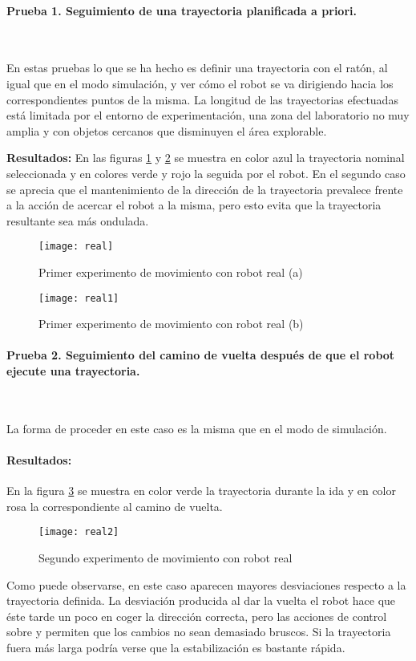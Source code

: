 \paragraph{Prueba 1. Seguimiento de una trayectoria planificada a priori.}\ %

\noindent
En estas pruebas lo que se ha hecho es definir una trayectoria con el ratón, al igual que en el modo simulación, y ver cómo el robot se va dirigiendo hacia los correspondientes puntos de la misma. La longitud de las trayectorias efectuadas está limitada por el entorno de experimentación, una zona del laboratorio no muy amplia y con objetos cercanos que disminuyen el área explorable.

\textbf{Resultados:}
En las figuras \ref{fg:real1a} y \ref{fg:real1b} se muestra en color azul la trayectoria nominal seleccionada y en colores verde y rojo la seguida por el robot.
En el segundo caso se aprecia que el mantenimiento de la dirección de la trayectoria prevalece frente a la acción de acercar el robot a la misma, pero esto evita que la trayectoria resultante sea más ondulada.

\begin{figure}[h]
  \centering\texttt{[image: real]}
  \caption{Primer experimento de movimiento con robot real (a)}\label{fg:real1a}
\end{figure}

\begin{figure}[h]
  \centering\texttt{[image: real1]}
  \caption{Primer experimento de movimiento con robot real (b)}\label{fg:real1b}
\end{figure}

\paragraph{Prueba 2. Seguimiento del camino de vuelta después de que el robot ejecute una trayectoria.}\ %

\noindent
La forma de proceder en este caso es la misma que en el modo de simulación.

\paragraph{Resultados:}
En la figura \ref{fg:real2} se muestra en color verde la trayectoria durante la ida y en color rosa la correspondiente al camino de vuelta.

\begin{figure}[h]
  \centering\texttt{[image: real2]}\\
  \caption{Segundo experimento de movimiento con robot real}\label{fg:real2}
\end{figure}

\noindent
Como puede observarse, en este caso aparecen mayores desviaciones respecto a la trayectoria definida. La desviación producida al dar la vuelta el robot hace que éste tarde un poco en coger la dirección correcta, pero las acciones de control sobre  y  permiten que los cambios no sean demasiado bruscos. Si la trayectoria fuera más larga podría verse que la estabilización es bastante rápida.
